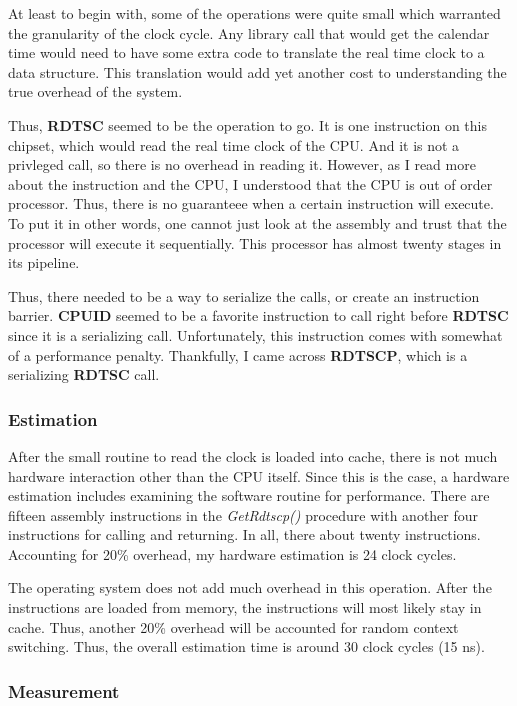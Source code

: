 \documentclass[paper=a4, fontsize=11pt]{scrartcl}
\numberwithin{equation}{section}        %
\numberwithin{figure}{section}          %
\numberwithin{table}{section}               %
\begin{document}
At least to begin with, some of the operations were quite small which warranted the granularity of the clock cycle.  Any library call that would get the calendar time would need to have some extra code to translate the real time clock to a data structure.  This translation would add yet another cost to understanding the true overhead of the system.

Thus, \textbf{RDTSC} seemed to be the operation to go.  It is one instruction on this chipset, which would read the real time clock of the CPU.  And it is not a privleged call, so there is no overhead in reading it.  However, as I read more about the instruction and the CPU, I understood that the CPU is out of order processor.  Thus, there is no guaranteee when a certain instruction will execute.  To put it in other words, one cannot just look at the assembly and trust that the processor will execute it sequentially.  This processor has almost twenty stages in its pipeline.

Thus, there needed to be a way to serialize the calls, or create an instruction barrier.  \textbf{CPUID} seemed to be a favorite instruction to call right before \textbf{RDTSC} since it is a serializing call.  Unfortunately, this instruction comes with somewhat of a performance penalty.  Thankfully, I came across \textbf{RDTSCP}, which is a serializing \textbf{RDTSC} call.

\subsubsection{Estimation}

After the small routine to read the clock is loaded into cache, there is not much hardware interaction other than the CPU itself.  Since this is the case, a hardware estimation includes examining the software routine for performance.  There are fifteen assembly instructions in the \textit{GetRdtscp()} procedure with another four instructions for calling and returning.  In all, there about twenty instructions.  Accounting for 20\% overhead, my hardware estimation is 24 clock cycles.

The operating system does not add much overhead in this operation.  After the instructions are loaded from memory, the instructions will most likely stay in cache.  Thus, another 20\% overhead will be accounted for random context switching.  Thus, the overall estimation time is around 30 clock cycles (15 ns).

\subsubsection{Measurement}
\end{document}
